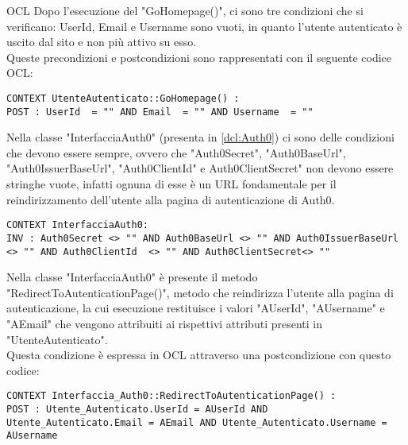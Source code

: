 \begin{listaPersonale}{OCL}
    Dopo l'esecuzione del "GoHomepage()", ci sono tre condizioni che si verificano: UserId, Email e Username sono vuoti, in quanto l'utente autenticato è uscito dal sito e non più attivo su esso. \\
    Queste precondizioni e postcondizioni sono rappresentati con il seguente codice OCL:
    \begin{lstlisting}
CONTEXT UtenteAutenticato::GoHomepage() :
POST : UserId  = "" AND Email  = "" AND Username  = ""
    \end{lstlisting}





    \begin{center}
        
    \end{center}
    Nella classe "InterfacciaAuth0" (presenta in \ref{dcl:Auth0}) ci sono delle condizioni che devono essere sempre, ovvero che "Auth0Secret", "Auth0BaseUrl", "Auth0IssuerBaseUrl", "Auth0ClientId" e Auth0ClientSecret" non devono essere stringhe vuote, infatti ognuna di esse è un URL fondamentale per il reindirizzamento dell'utente alla pagina di autenticazione di Auth0.
    \begin{lstlisting}
CONTEXT InterfacciaAuth0:
INV : Auth0Secret <> "" AND Auth0BaseUrl <> "" AND Auth0IssuerBaseUrl <> "" AND Auth0ClientId  <> "" AND Auth0ClientSecret<> ""
    \end{lstlisting}

    Nella classe "InterfacciaAuth0"  è presente il metodo "RedirectToAutenticationPage()", metodo che reindirizza l'utente alla pagina di autenticazione, la cui esecuzione restituisce i valori "AUserId", "AUsername" e "AEmail" che vengono attribuiti ai rispettivi attributi presenti in "UtenteAutenticato". \\
    Questa condizione è espressa in OCL attraverso una postcondizione con questo codice:
    \begin{lstlisting}
CONTEXT Interfaccia_Auth0::RedirectToAutenticationPage() :
POST : Utente_Autenticato.UserId = AUserId AND Utente_Autenticato.Email = AEmail AND Utente_Autenticato.Username = AUsername
    \end{lstlisting}
    \newpage




\end{listaPersonale}
